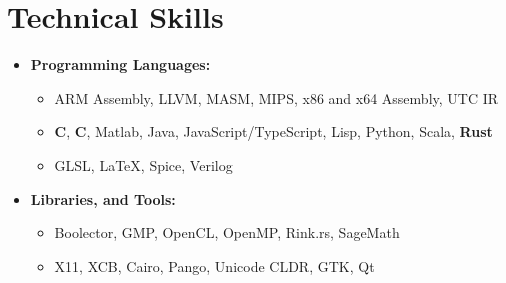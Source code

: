 \documentclass[10pt,letterpaper,sans]{moderncv}
\renewcommand{\_}{\textscale{.7}{\textunderscore}}
\newcommand{\Rplus}{\protect\hspace{-.1em}\protect\raisebox{.35ex}{\smaller{\smaller\textbf{+}}}}
\newcommand{\Cpp}{\mbox{C\Rplus\Rplus}\xspace}
\newcommand{\+}{%
  \raisebox{\dimexpr(\fontcharht\font`X-\height+\depth)/2\relax}{+}%
}
\begin{document}
\section{Technical Skills}
\begin{itemize}
\item \textbf{Programming Languages:}
  \begin{itemize}
  \item {} ARM Assembly, LLVM, MASM, MIPS, x86 and x64 Assembly, UTC IR
  \item {} \textbf{C}, \textbf{\Cpp}, Matlab, Java, JavaScript/TypeScript, Lisp, Python, Scala, \textbf{Rust}
  \item {} GLSL, \LaTeX, Spice, Verilog
  \end{itemize}
\item \textbf{Libraries, and Tools:} 
  \begin{itemize}
  \item {} Boolector, GMP, OpenCL, OpenMP, Rink.rs, SageMath
  \item {} X11, XCB, Cairo, Pango, Unicode CLDR, GTK, Qt
  \end{itemize}
\end{itemize}
\end{document}

